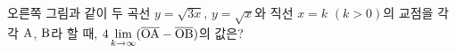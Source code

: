 \noindent\begin{minipage}[t]{0.58\linewidth}\vspace{0pt}\raggedright 오른쪽 그림과 같이 두 곡선 $y=\sqrt{3x}$, $y=\sqrt{x}$와 직선 $x=k$ $(k>0)$의 교점을 각각 $\mathrm{A}$, $\mathrm{B}$라 할 때, $4\displaystyle\lim_{k\to\infty}(\overline{\mathrm{OA}}-\overline{\mathrm{OB}})$의 값은? \end{minipage}\hfill\begin{minipage}[t]{0.4\linewidth}\vspace{0pt}\centering \resizebox{\ifdim\width>\linewidth\linewidth\else\width\fi}{!}{}\end{minipage}\par
{}
